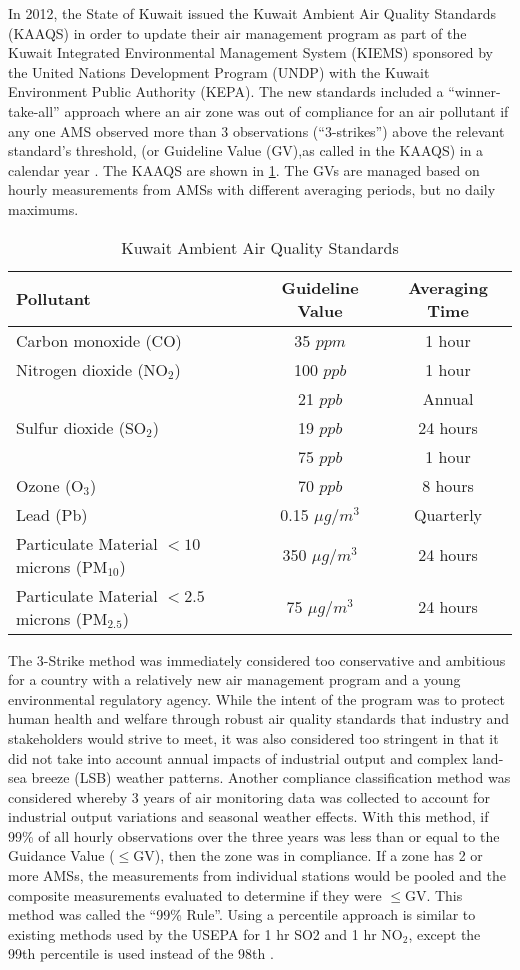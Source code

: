 In 2012, the State of Kuwait issued the Kuwait Ambient Air Quality Standards (KAAQS) in order to update their air management program as part of the Kuwait Integrated Environmental Management System (KIEMS) sponsored by the United Nations Development Program (UNDP) with the Kuwait Environment Public Authority (KEPA). The new standards included a ``winner-take-all” approach where an air zone was out of compliance for an air pollutant if any one AMS observed more than 3 observations (``3-strikes”) above the relevant standard’s threshold,  (or Guideline Value (GV),as called in the KAAQS) in a calendar year \citep{KEPA2017}. The KAAQS are shown in \ref{tb:1kaaqs}. The GVs are managed based on hourly measurements from AMSs with different averaging periods, but no daily maximums.
%
\begin{table}[!htb]
\centering
\caption{Kuwait Ambient Air Quality Standards}
\label{tb:1kaaqs}
\begin{tabular}{@{}lcc@{}}
\toprule
\textbf{Pollutant} & \textbf{Guideline Value} & \textbf{Averaging Time} \\ \midrule
Carbon monoxide (CO) & 35 $ppm$ & 1 hour \\
Nitrogen dioxide (NO$_{2}$) & 100 $ppb$ & 1 hour \\
 & 21 $ppb$ & Annual \\
Sulfur dioxide (SO$_{2}$) & 19 $ppb$ & 24 hours \\
 & 75 $ppb$ & 1 hour \\
Ozone (O$_{3}$) & 70 $ppb$ & 8 hours \\
Lead (Pb) & 0.15 $\mu g/m^{3}$ & Quarterly \\
Particulate Material $<10$ microns (PM$_{10}$) & 350 $\mu g/m^{3}$ & 24 hours \\
Particulate Material $<2.5$ microns (PM$_{2.5}$) & 75 $\mu g/m^{3}$ & 24 hours \\ \bottomrule
\end{tabular}
\end{table}
%
The 3-Strike method was immediately considered too conservative and ambitious for a country with a relatively new air management program and a young environmental regulatory agency. While the intent of the program was to protect human health and welfare through robust air quality standards that industry and stakeholders would strive to meet, it was also considered too stringent in that it did not take into account annual impacts of industrial output and complex land-sea breeze (LSB) weather patterns. Another compliance classification method was considered whereby 3 years of air monitoring data was collected to account for industrial output variations and seasonal weather effects. With this method, if 99\% of all hourly observations over the three years was less than or equal to the Guidance Value ($\leq$GV), then the zone was in compliance. If a zone has 2 or more AMSs, the measurements from individual stations would be pooled and the composite measurements evaluated to determine if they were $\leq$GV. This method was called the ``99\% Rule”. Using a percentile approach is similar to existing methods used by the USEPA for 1 hr SO2 and 1 hr NO$_{2}$, except the 99th percentile is used instead of the 98th \citep{USEPA2016a}.

